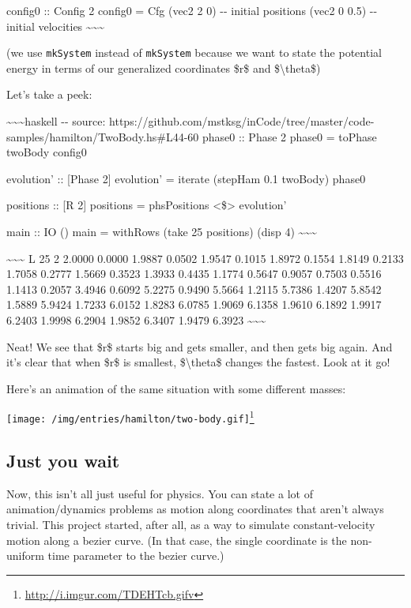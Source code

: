 \documentclass[]{article}
\renewcommand{\href}[2]{#2\footnote{\url{#1}}}
\begin{document}
config0 :: Config 2 config0 = Cfg (vec2 2 0) -\/- initial positions (vec2 0 0.5)
-\/- initial velocities \textasciitilde{}\textasciitilde{}\textasciitilde{}

(we use \texttt{mkSystem} instead of \texttt{mkSystem\textquotesingle{}} because
we want to state the potential energy in terms of our generalized coordinates
\$r\$ and \$\textbackslash{}theta\$)

Let's take a peek:

\textasciitilde{}\textasciitilde{}\textasciitilde{}haskell -\/- source:
https://github.com/mstksg/inCode/tree/master/code-samples/hamilton/TwoBody.hs\#L44-60
phase0 :: Phase 2 phase0 = toPhase twoBody config0

evolution' :: {[}Phase 2{]} evolution' = iterate (stepHam 0.1 twoBody) phase0

positions :: {[}R 2{]} positions = phsPositions \textless{}\$\textgreater{}
evolution'

main :: IO () main = withRows (take 25 positions) (disp 4)
\textasciitilde{}\textasciitilde{}\textasciitilde{}

\textasciitilde{}\textasciitilde{}\textasciitilde{} L 25 2 2.0000 0.0000 1.9887
0.0502 1.9547 0.1015 1.8972 0.1554 1.8149 0.2133 1.7058 0.2777 1.5669 0.3523
1.3933 0.4435 1.1774 0.5647 0.9057 0.7503 0.5516 1.1413 0.2057 3.4946 0.6092
5.2275 0.9490 5.5664 1.2115 5.7386 1.4207 5.8542 1.5889 5.9424 1.7233 6.0152
1.8283 6.0785 1.9069 6.1358 1.9610 6.1892 1.9917 6.2403 1.9998 6.2904 1.9852
6.3407 1.9479 6.3923 \textasciitilde{}\textasciitilde{}\textasciitilde{}

Neat! We see that \$r\$ starts big and gets smaller, and then gets big again.
And it's clear that when \$r\$ is smallest, \$\textbackslash{}theta\$ changes
the fastest. Look at it go!

Here's an animation of the same situation with some different masses:

\href{http://i.imgur.com/TDEHTcb.gifv}{\texttt{[image: /img/entries/hamilton/two-body.gif]}}

\subsection{Just you wait}

Now, this isn't all just useful for physics. You can state a lot of
animation/dynamics problems as motion along coordinates that aren't always
trivial. This project started, after all, as a way to simulate constant-velocity
motion along a bezier curve. (In that case, the single coordinate is the
non-uniform time parameter to the bezier curve.)
\end{document}
